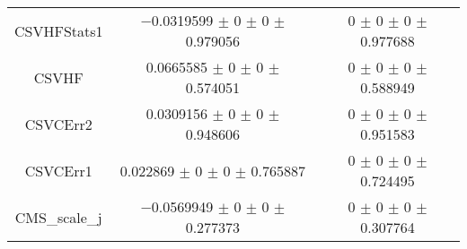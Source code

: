 \begin{table}
\begin{tabular}{ccc}
CSVHFStats1 & \num{-0.0319599} $\pm$ \num{0} $\pm$ \num{0} $\pm$ \num{0.979056} & \num{0} $\pm$ \num{0} $\pm$ \num{0} $\pm$ \num{0.977688}\\
CSVHF & \num{0.0665585} $\pm$ \num{0} $\pm$ \num{0} $\pm$ \num{0.574051} & \num{0} $\pm$ \num{0} $\pm$ \num{0} $\pm$ \num{0.588949}\\
CSVCErr2 & \num{0.0309156} $\pm$ \num{0} $\pm$ \num{0} $\pm$ \num{0.948606} & \num{0} $\pm$ \num{0} $\pm$ \num{0} $\pm$ \num{0.951583}\\
CSVCErr1 & \num{0.022869} $\pm$ \num{0} $\pm$ \num{0} $\pm$ \num{0.765887} & \num{0} $\pm$ \num{0} $\pm$ \num{0} $\pm$ \num{0.724495}\\
CMS\_scale\_j & \num{-0.0569949} $\pm$ \num{0} $\pm$ \num{0} $\pm$ \num{0.277373} & \num{0} $\pm$ \num{0} $\pm$ \num{0} $\pm$ \num{0.307764}\\
\bottomrule
\end{tabular}
\end{table}